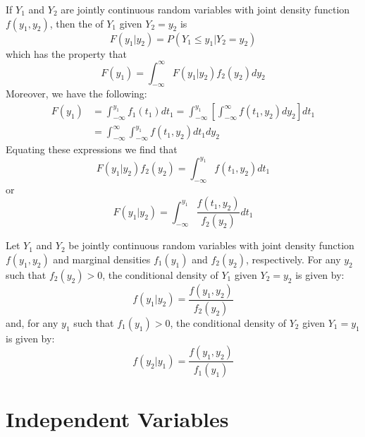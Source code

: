 \documentclass[12pt, a4paper, twoside, openright, titlepage]{book}
\begin{document}
\begin{defn}{}{}
    If $Y_1$ and $Y_2$ are jointly continuous random variables with joint density function $f(y_1,y_2)$, then the  of $Y_1$ given $Y_2 = y_2$ is \begin{equation*}
        F(y_1\vert y_2) = P(Y_1\leq y_1\vert Y_2 = y_2)
    \end{equation*}
    which has the property that \begin{equation*}
        F(y_1) = \int_{-\infty}^{\infty}F(y_1\vert y_2)f_2(y_2)dy_2
    \end{equation*}
    Moreover, we have the following: \begin{align*}
        F(y_1) &= \int_{-\infty}^{y_1}f_1(t_1)dt_1 = \int_{-\infty}^{y_1}\left[\int_{-\infty}^{\infty}f(t_1,y_2)dy_2\right]dt_1 \\
        &= \int_{-\infty}^{\infty}\int_{-\infty}^{y_1}f(t_1,y_2)dt_1dy_2
    \end{align*}
    Equating these expressions we find that \begin{equation*}
        F(y_1\vert y_2)f_2(y_2) = \int_{-\infty}^{y_1}f(t_1,y_2)dt_1
    \end{equation*}
    or \begin{equation*}
        F(y_1\vert y_2)= \int_{-\infty}^{y_1}\frac{f(t_1,y_2)}{f_2(y_2)}dt_1
    \end{equation*}
\end{defn}


\begin{defn}{}{}
    Let $Y_1$ and $Y_2$ be jointly continuous random variables with joint density function $f(y_1,y_2)$ and marginal densities $f_1(y_1)$ and $f_2(y_2)$, respectively. For any $y_2$ such that $f_2(y_2) > 0$, the conditional density of $Y_1$ given $Y_2 = y_2$ is given by: \begin{equation*}
        f(y_1\vert y_2) = \frac{f(y_1,y_2)}{f_2(y_2)}
    \end{equation*}
    and, for any $y_1$ such that $f_1(y_1) > 0$, the conditional density of $Y_2$ given $Y_1 = y_1$ is given by: \begin{equation*}
        f(y_2\vert y_1) = \frac{f(y_1,y_2)}{f_1(y_1)}
    \end{equation*}
\end{defn}


\section{\textsection Independent Variables}
\end{document}
